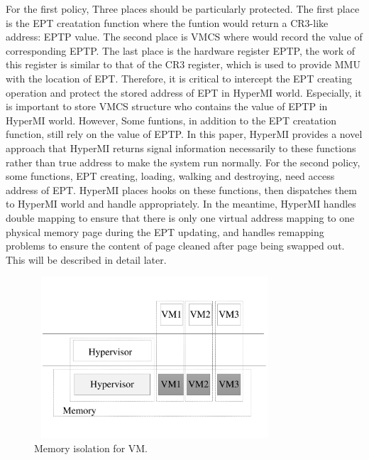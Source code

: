 \documentclass[conference]{IEEEtran}
\begin{document}
For the first policy, Three places should be particularly protected. The first place is the EPT creatation function where the funtion would return a CR3-like address: EPTP value. The second place is VMCS where would record the value of corresponding EPTP. The last place is the hardware register EPTP, the work of this register is similar to that of the CR3 register, which is used to provide MMU with the location of EPT. 
Therefore, it is critical to intercept the EPT creating operation and protect the stored address of EPT in HyperMI world. Especially, it is important to store VMCS structure who contains the value of EPTP in HyperMI world. 
However, Some funtions, in addition to the EPT creatation function, still rely on the value of EPTP. In this paper, HyperMI provides a novel approach that HyperMI returns signal information necessarily to these functions rather than true address to make the system run normally. 
For the second policy, some functions, EPT creating, loading, walking and destroying, need access address of EPT. HyperMI places hooks on these functions, then dispatches them to HyperMI world and handle appropriately. In the meantime, HyperMI handles double mapping to ensure that there is only one virtual address mapping to one physical memory page during the EPT updating, and handles remapping problems to ensure the content of page cleaned after page being swapped out. This will be described in detail later.
\begin{figure}
\centerline{\includegraphics[width=9cm, height=6cm]{pdfvmcs3.pdf}}%
\caption{Memory isolation for VM.} \label{fig3}
\end{figure}
\end{document}
